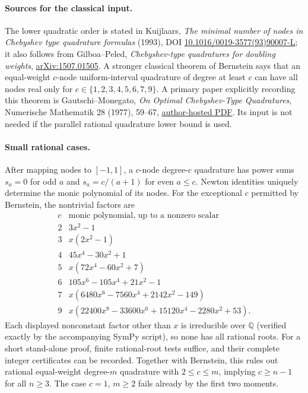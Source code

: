 \documentclass[11pt]{article}
\begin{document}
\paragraph{Sources for the classical input.}
The lower quadratic order is stated in Kuijlaars,
\emph{The minimal number of nodes in Chebyshev type quadrature formulas}
(1993), DOI \href{https://doi.org/10.1016/0019-3577(93)90007-L}
{10.1016/0019-3577(93)90007-L}; it also follows from Gilboa--Peled,
\emph{Chebyshev-type quadratures for doubling weights},
\href{https://arxiv.org/abs/1507.01505}{arXiv:1507.01505}.
A stronger classical theorem of Bernstein says that an equal-weight
$c$-node uniform-interval quadrature of degree at least $c$ can have all
nodes real only for $c\in\{1,2,3,4,5,6,7,9\}$.
A primary paper explicitly recording this theorem is Gautschi--Monegato,
\emph{On Optimal Chebyshev-Type Quadratures}, Numerische Mathematik
28 (1977), 59--67,
\href{https://www.cs.purdue.edu/homes/wxg/selected_works/section_06/058.pdf}
{author-hosted PDF}. Its input is not needed if the parallel rational
quadrature lower bound is used.

\paragraph{Small rational cases.}
After mapping nodes to $[-1,1]$, a $c$-node degree-$c$ quadrature has power
sums $s_a=0$ for odd $a$ and $s_a=c/(a+1)$ for even $a\leq c$.
Newton identities uniquely determine the monic polynomial of its nodes.
For the exceptional $c$ permitted by Bernstein, the nontrivial factors are
\[
\begin{array}{c|l}
 c&\text{monic polynomial, up to a nonzero scalar}\\ \hline
 2&3x^2-1\\
 3&x(2x^2-1)\\
 4&45x^4-30x^2+1\\
 5&x(72x^4-60x^2+7)\\
 6&105x^6-105x^4+21x^2-1\\
 7&x(6480x^6-7560x^4+2142x^2-149)\\
 9&x(22400x^8-33600x^6+15120x^4-2280x^2+53).
\end{array}
\]
Each displayed nonconstant factor other than $x$ is irreducible over
$\mathbb Q$ (verified exactly by the accompanying SymPy script), so none
has all rational roots. For a short stand-alone proof, finite rational-root
tests suffice, and their complete integer certificates can be recorded.
Together with Bernstein, this rules out rational equal-weight degree-$m$
quadrature with $2\leq c\leq m$, implying $c\geq n-1$ for all $n\geq3$.
The case $c=1$, $m\geq2$ fails already by the first two moments.
\end{document}
